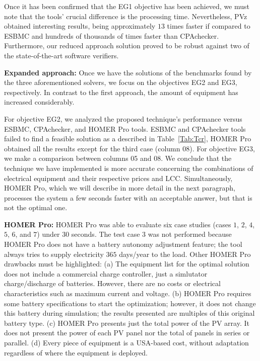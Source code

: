 \documentclass[review]{elsarticle}
\begin{document}
Once it has been confirmed that the EG1 objective has been achieved, we must note that the tools' crucial difference is the processing time. Nevertheless, PVz obtained interesting results, being approximately $13$ times faster if compared to ESBMC and hundreds of thousands of times faster than CPAchecker. Furthermore, our reduced approach solution proved to be robust against two of the state-of-the-art software verifiers.

\textbf{Expanded approach:} Once we have the solutions of the benchmarks found by the three aforementioned solvers, we focus on the objectives EG2 and EG3, respectively. In contrast to the first approach, the amount of equipment has increased considerably.

For objective EG2, we analyzed the proposed technique's performance versus ESBMC, CPAchecker, and HOMER Pro tools. ESBMC and CPAchecker tools failed to find a feasible solution as a described in Table~\ref{Tab:Tcr}, HOMER Pro obtained all the results except for the third case (column 08). For objective EG3, we make a comparison between columns 05 and 08. We conclude that the technique we have implemented is more accurate concerning the combinations of electrical equipment and their respective prices and LCC. Simultaneously, HOMER Pro, which we will describe in more detail in the next paragraph, processes the system a few seconds faster with an acceptable answer, but that is not the optimal one.

\textbf{HOMER Pro:} HOMER Pro was able to evaluate six case studies (cases $1$, $2$, $4$, $5$, $6$, and $7$) under $30$ seconds. The test case $3$ was not performed because HOMER Pro does not have a battery autonomy adjustment feature; the tool always tries to supply electricity $365$ days/year to the load. Other HOMER Pro drawbacks must be highlighted: (a) The equipment list for the optimal solution does not include a commercial charge controller, just a simlutator charge/discharge of batteries. However, there are no costs or electrical characteristics such as maximum current and voltage. (b) HOMER Pro requires some battery specifications to start the optimization; however, it does not change this battery during simulation; the results presented are multiples of this original battery type. (c) HOMER Pro presents just the total power of the PV array. It does not present the power of each PV panel nor the total of panels in series or parallel. (d) Every piece of equipment is a USA-based cost, without adaptation regardless of where the equipment is deployed.
\end{document}
